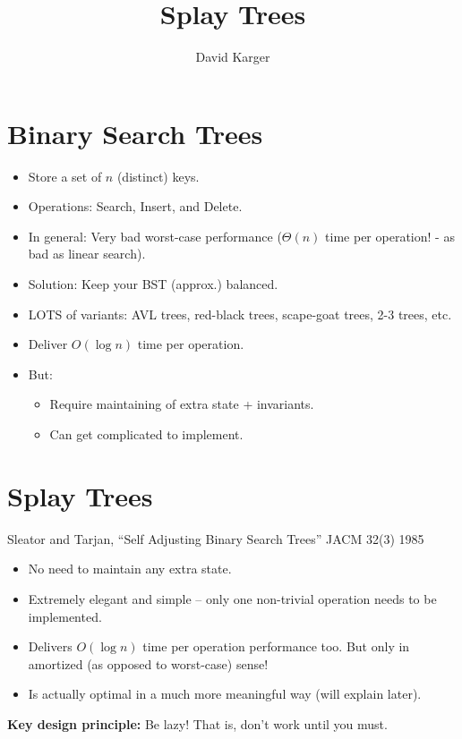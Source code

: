 \documentclass{article}
\title{Splay Trees}
\author{David Karger}
\begin{document}

\section{Binary Search Trees}

\begin{itemize}
\item Store a set of $n$ (distinct) keys.
\item Operations: Search, Insert, and Delete.
\item In general: Very bad worst-case performance ($\Theta(n)$ time per operation! - as bad as linear search).
\item Solution: Keep your BST (approx.) balanced.
\item LOTS of variants: AVL trees, red-black trees, scape-goat trees, 2-3 trees, etc.
\item Deliver $O(\log n)$ time per operation.
\item But: 
\begin{itemize}
\item Require maintaining of extra state + invariants.
\item Can get complicated to implement.
\end{itemize} 
\end{itemize}

\section{Splay Trees}

Sleator and Tarjan, ``Self Adjusting Binary Search Trees'' JACM 32(3)
1985


\begin{itemize}
\item No need to maintain any extra state.
\item Extremely elegant and simple -- only one non-trivial operation needs to be implemented.
\item Delivers $O(\log n)$ time per operation performance too. But only in amortized (as opposed to worst-case) sense!
\item Is actually optimal in a much more meaningful way (will explain later).
\end{itemize}

{\bf Key design principle:} Be lazy! That is, don't work until you must. 
\end{document}
